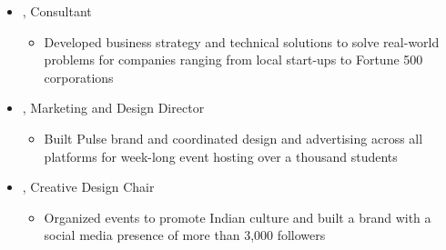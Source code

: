 \documentclass[10pt,letterpaper]{article}
\def\Vhrulefill{\leavevmode\leaders\hrule height 0.7ex depth \dimexpr0.4pt-0.7ex\hfill\kern0pt}
\begin{document}
\begin{itemize}[label={}]
 \item \small{, Consultant \hfill {}}
 \vspace{-1.58mm}
 \begin{itemize}[label={}]
 	\item \small{Developed business strategy and technical solutions to solve real-world problems for companies ranging from local start-ups to Fortune 500 corporations}
 \end{itemize}
 \item \small{, Marketing and Design Director \hfill {}}
 \vspace{-1.58mm}
 \begin{itemize}[label={}]
 	\item \small{Built Pulse brand and coordinated design and advertising across all platforms for week-long event hosting over a thousand students}
 \end{itemize}
 \item \small{, Creative Design Chair \hfill {}}
 \vspace{-1.58mm}
 \begin{itemize}[label={}]
 	\item \small{Organized events to promote Indian culture and built a brand with a social media presence of more than 3,000 followers}
 \end{itemize}
\end{itemize}









%
%


\end{document}
